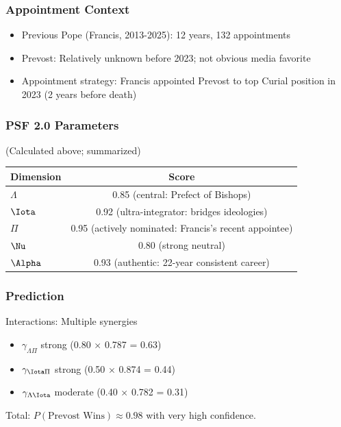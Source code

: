 \subsubsection{Appointment Context}

\begin{itemize}
\item Previous Pope (Francis, 2013-2025): 12 years, 132 appointments
\item Prevost: Relatively unknown before 2023; not obvious media favorite
\item Appointment strategy: Francis appointed Prevost to top Curial position in 2023 (2 years before death)
\end{itemize}

\subsubsection{PSF 2.0 Parameters}

(Calculated above; summarized)

\begin{table}[h]
\centering
\begin{tabular}{|l|c|}
\hline
Dimension & Score \\
\hline
$\Lambda$ & 0.85 (central: Prefect of Bishops) \\
$\Iota$ & 0.92 (ultra-integrator: bridges ideologies) \\
$\Pi$ & 0.95 (actively nominated: Francis's recent appointee) \\
$\Nu$ & 0.80 (strong neutral) \\
$\Alpha$ & 0.93 (authentic: 22-year consistent career) \\
\hline
\end{tabular}
\end{table}

\subsubsection{Prediction}

Interactions: Multiple synergies
\begin{itemize}
\item $\gamma_{\Lambda\Pi}$ strong (0.80 × 0.787 = 0.63)
\item $\gamma_{\Iota\Pi}$ strong (0.50 × 0.874 = 0.44)
\item $\gamma_{\Lambda\Iota}$ moderate (0.40 × 0.782 = 0.31)
\end{itemize}

Total: $P(\text{Prevost Wins}) \approx 0.98$ with very high confidence.

